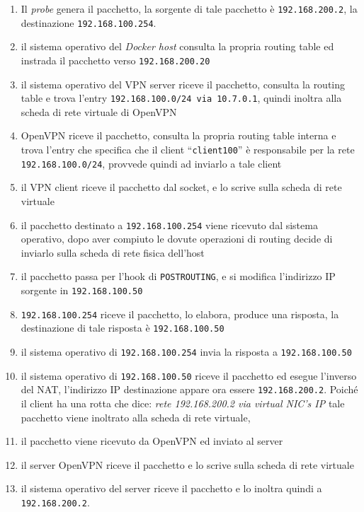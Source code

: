 \begin{enumerate}
  \item Il \textit{probe} genera il pacchetto, la sorgente di tale pacchetto è
  \texttt{192.168.200.2}, la destinazione \texttt{192.168.100.254}.
  \item il sistema operativo del \textit{Docker host} consulta la propria routing table
  ed instrada il pacchetto verso \texttt{192.168.200.20}
  \item il sistema operativo del VPN server riceve il pacchetto, consulta la
  routing table e trova l'entry \texttt{192.168.100.0/24 via 10.7.0.1}, quindi inoltra
  alla scheda di rete virtuale di OpenVPN
  \item OpenVPN riceve il pacchetto, consulta la propria routing table interna e
  trova l'entry che specifica che il client ``\texttt{client100}'' è responsabile per
  la rete \texttt{192.168.100.0/24}, provvede quindi ad inviarlo a tale client
  \item il VPN client riceve il pacchetto dal socket, e lo scrive sulla scheda di rete
  virtuale
  \item il pacchetto destinato a \texttt{192.168.100.254} viene ricevuto dal sistema
  operativo, dopo aver compiuto le dovute operazioni di routing decide di inviarlo
  sulla scheda di rete fisica dell'host
  \item il pacchetto passa per l'hook di \texttt{POSTROUTING}, e si modifica l'indirizzo IP
  sorgente in \texttt{192.168.100.50}
  \item \texttt{192.168.100.254} riceve il pacchetto, lo elabora, produce una risposta,
  la destinazione di tale risposta è \texttt{192.168.100.50}
  \item il sistema operativo di \texttt{192.168.100.254} invia la risposta a
  \texttt{192.168.100.50}
  \item il sistema operativo di \texttt{192.168.100.50} riceve il pacchetto ed
  esegue l'inverso del NAT, l'indirizzo IP destinazione appare ora essere \texttt{192.168.200.2}.
  Poiché il client ha una rotta che dice: \textit{rete 192.168.200.2 via virtual NIC's IP}
  tale pacchetto viene inoltrato alla scheda di rete virtuale,
  \item il pacchetto viene ricevuto da OpenVPN ed inviato al server
  \item il server OpenVPN riceve il pacchetto e lo scrive sulla scheda di rete virtuale
  \item il sistema operativo del server riceve il pacchetto e lo inoltra quindi a
  \texttt{192.168.200.2}.
\end{enumerate}


